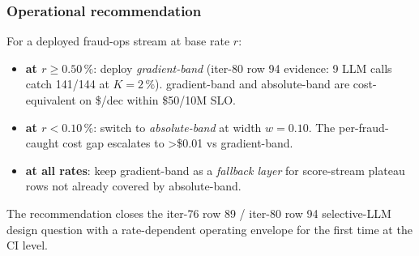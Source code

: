 \subsubsection{Operational recommendation}
For a deployed fraud-ops stream at base rate $r$:
\begin{itemize}
  \item \textbf{at $r \geq 0.50\,\%$}: deploy \textit{gradient-band}
        (iter-80 row 94 evidence: 9 LLM calls catch 141/144 at
        $K{=}2\,\%$). gradient-band and absolute-band are
        cost-equivalent on \$/dec within \$50/10M SLO.
  \item \textbf{at $r < 0.10\,\%$}: switch to
        \textit{absolute-band} at width $w{=}0.10$. The
        per-fraud-caught cost gap escalates to >\$0.01 vs
        gradient-band.
  \item \textbf{at all rates}: keep gradient-band as a
        \emph{fallback layer} for score-stream plateau rows not
        already covered by absolute-band.
\end{itemize}
The recommendation closes the iter-76 row 89 / iter-80 row 94
selective-LLM design question with a rate-dependent operating
envelope for the first time at the CI level.
